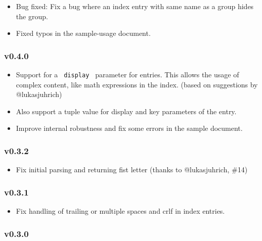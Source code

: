\begin{itemize}
\tightlist
\item
  Bug fixed: Fix a bug where an index entry with same name as a group
  hides the group.
\item
  Fixed typos in the sample-usage document.
\end{itemize}

\subsubsection{v0.4.0}\label{v0.4.0}

\begin{itemize}
\tightlist
\item
  Support for a \texttt{\ display\ } parameter for entries. This allows
  the usage of complex content, like math expressions in the index.
  (based on suggestions by @lukasjuhrich)
\item
  Also support a tuple value for display and key parameters of the
  entry.
\item
  Improve internal robustness and fix some errors in the sample
  document.
\end{itemize}

\subsubsection{v0.3.2}\label{v0.3.2}

\begin{itemize}
\tightlist
\item
  Fix initial parsing and returning fist letter (thanks to
  @lukasjuhrich, \#14)
\end{itemize}

\subsubsection{v0.3.1}\label{v0.3.1}

\begin{itemize}
\tightlist
\item
  Fix handling of trailing or multiple spaces and crlf in index entries.
\end{itemize}

\subsubsection{v0.3.0}\label{v0.3.0}

